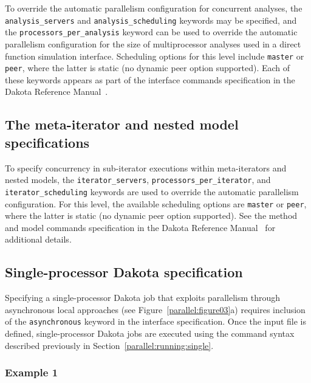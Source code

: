 To override the automatic parallelism configuration for concurrent
analyses, the \texttt{analysis\_servers} and
\texttt{analysis\_scheduling} keywords may be specified, and the
\texttt{processors\_per\_analysis} keyword can be used to override the
automatic parallelism configuration for the size of multiprocessor
analyses used in a direct function simulation interface. Scheduling
options for this level include \texttt{master} or \texttt{peer}, where
the latter is static (no dynamic peer option supported).  Each of
these keywords appears as part of the interface commands specification
in the Dakota Reference Manual~\cite{RefMan}.

\subsection{The meta-iterator and nested model specifications}\label{parallel:spec:meta}

To specify concurrency in sub-iterator executions within
meta-iterators and nested models, the \texttt{iterator\_servers},
\texttt{processors\_per\_iterator}, and \texttt{iterator\_scheduling}
keywords are used to override the automatic parallelism configuration.
For this level, the available scheduling options are \texttt{master}
or \texttt{peer}, where the latter is static (no dynamic peer option
supported).  See the method and model commands specification in the
Dakota Reference Manual~\cite{RefMan} for additional details.

\subsection{Single-processor Dakota specification}\label{parallel:spec:single}

Specifying a single-processor Dakota job that exploits parallelism
through asynchronous local approaches (see
Figure~\ref{parallel:figure03}a) requires inclusion of the
\texttt{asynchronous} keyword in the interface specification. Once the
input file is defined, single-processor Dakota jobs are executed using
the command syntax described previously in
Section~\ref{parallel:running:single}.

\subsubsection{Example 1}\label{parallel:spec:single:example1}

